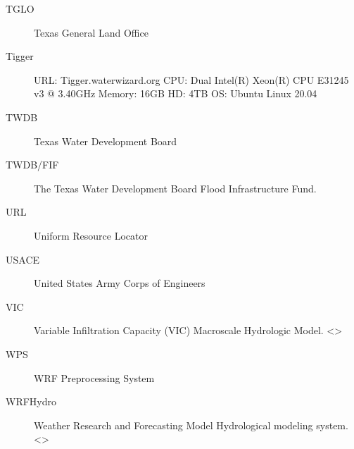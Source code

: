 \documentclass[letterpaper,10pt,english]{sphinxmanual}
\begin{document}
\begin{description}
\item[{TGLO\label{\detokenize{glossary:term-TGLO}}}] \leavevmode
\sphinxAtStartPar
Texas General Land Office

\item[{Tigger\label{\detokenize{glossary:term-Tigger}}}] \leavevmode
\sphinxAtStartPar
URL: Tigger.water\sphinxhyphen{}wizard.org CPU: Dual Intel(R) Xeon(R) CPU E3\sphinxhyphen{}1245 v3 @ 3.40GHz Memory: 16GB HD: 4TB OS: Ubuntu Linux 20.04

\item[{TWDB\label{\detokenize{glossary:term-TWDB}}}] \leavevmode
\sphinxAtStartPar
Texas Water Development Board

\item[{TWDB/FIF\label{\detokenize{glossary:term-TWDB-FIF}}}] \leavevmode
\sphinxAtStartPar
The Texas Water Development Board Flood Infrastructure Fund.

\item[{URL\label{\detokenize{glossary:term-URL}}}] \leavevmode
\sphinxAtStartPar
Uniform Resource Locator

\item[{USACE\label{\detokenize{glossary:term-USACE}}}] \leavevmode
\sphinxAtStartPar
United States Army Corps of Engineers

\item[{VIC\label{\detokenize{glossary:term-VIC}}}] \leavevmode
\sphinxAtStartPar
Variable Infiltration Capacity (VIC) Macroscale Hydrologic Model.  \textless{}\textgreater{}

\item[{WPS\label{\detokenize{glossary:term-WPS}}}] \leavevmode
\sphinxAtStartPar
WRF Preprocessing System

\item[{WRF\sphinxhyphen{}Hydro\label{\detokenize{glossary:term-WRF-Hydro}}}] \leavevmode
\sphinxAtStartPar
Weather Research and Forecasting Model Hydrological modeling system.   \textless{}\textgreater{}

\end{description}
\end{document}
